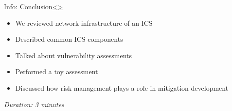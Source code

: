 \documentclass[12pt]{extarticle}
\newenvironment{instructionblock}{\Large\bgroup}{\egroup}
\newcommand{\bi}{\begin{itemize}}
\newcommand{\ei}{\end{itemize}}
\newcounter{next}
\newcounter{prev}
\begin{document}

\pagebreak
{}
\begin{slide}{Info: Conclusion}{\hyperref[slide \theprev]{\textless}\hyperref[slide \thenext]{\textgreater}}
	\begin{instructionblock}
		\bi
			\item We reviewed network infrastructure of an ICS
			\item Described common ICS components
			\item Talked about vulnerability assessments
			\item Performed a toy assessment
			\item Discussed how risk management plays a role in mitigation development
		\ei
	\end{instructionblock}
\end{slide}
\textit{Duration: 3 minutes}
\vfill
\noindent
\pagebreak

\end{document}
